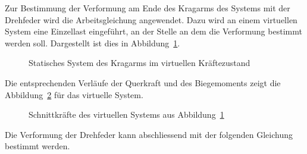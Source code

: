 \documentclass[
  11pt,
  letterpaper,
]{scrreprt}
\begin{document}
Zur Bestimmung der Verformung am Ende des Kragarms des Systems mit der
Drehfeder wird die Arbeitsgleichung angewendet. Dazu wird an einem
virtuellen System eine Einzellast eingeführt, an der Stelle an dem die
Verformung bestimmt werden soll. Dargestellt ist dies in
Abbildung~\ref{fig-kragarm-sys-virtuell}.

\begin{figure}[H]


\caption{\label{fig-kragarm-sys-virtuell}Statisches System des Kragarms
im virtuellen Kräftezustand}

\end{figure}%

Die entsprechenden Verläufe der Querkraft und des Biegemoments zeigt die
Abbildung~\ref{fig-sk-kragarm-virtuell} für das virtuelle System.

\begin{figure}[H]


\caption{\label{fig-sk-kragarm-virtuell}Schnittkräfte des virtuellen
Systems aus Abbildung~\ref{fig-kragarm-sys-virtuell}}

\end{figure}%

Die Verformung der Drehfeder kann abschliessend mit der folgenden
Gleichung bestimmt werden.
\end{document}
